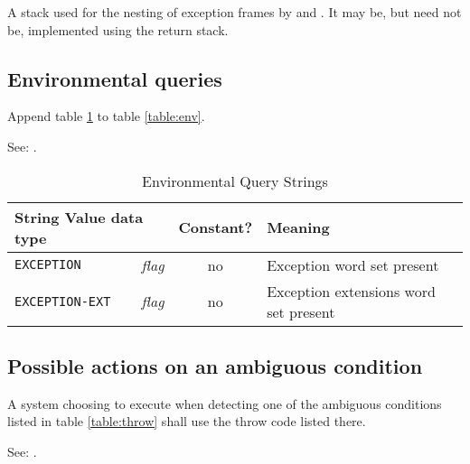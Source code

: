A stack used for the nesting of exception frames by 
and . It may be, but need not be, implemented using
the return stack.

\subsection{Environmental queries} %

Append table \ref{exception:env} to table \ref{table:env}.

See: .

\begin{table}[ht]
  \begin{center}
	\caption{Environmental Query Strings}
	\label{exception:env}
	\begin{tabular}{p{9em}rcp{}}
		\hline\hline
		\multicolumn{2}{l}{String \hfill Value data type} & Constant? & Meaning \\
		\hline
		\texttt{EXCEPTION}		& \emph{flag}	& no	&
			Exception word set present \\
		\texttt{EXCEPTION-EXT}	& \emph{flag}	& no	&
			Exception extensions word set present \\
		\hline\hline
	\end{tabular}
  \end{center}
\end{table}

\subsection{Possible actions on an ambiguous condition} %
\label{exception:ambiguous}

A system choosing to execute  when detecting one of the
ambiguous conditions listed in table \ref{table:throw} shall use the
throw code listed there.

See: .


\newcommand{\throwdef}[3][\empty]{%
	\ifx\empty#1%
		\defthrowcode{#2}{#3}
		\newline
	\else
		\cbstart
			\uline{\defthrowcode{#2}{#3}}
			\hfill{\tiny\textsf{#1}}
		\cbend\newline
	\fi
}


